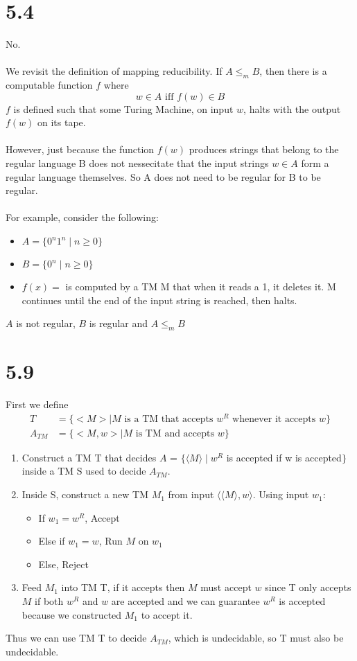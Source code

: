 \documentclass{article}
\begin{document}
\section*{5.4}

No.\\\\
We revisit the definition of mapping reducibility. If $A \leq_m B$, then there is a computable function $f$ where
$$w \in A \textrm{  iff   } f(w) \in B$$
$f$ is defined such that some Turing Machine, on input $w$, halts with the output $f(w)$ on its tape. \\\\
However, just because the function $f(w)$ produces strings that belong to the regular language B does not nessecitate that the input strings $w \in A$ form a regular language themselves. So A does not need to be regular for B to be regular.\\\\
For example, consider the following:
\begin{itemize}
\item $A = \{0^n1^n \mid n \geq 0\}$
\item $B = \{0^n \mid n \geq 0\}$
\item $f(x)= $ is computed by a TM M that when it reads a 1, it deletes it. M continues until the end of the input string is reached, then halts.
\end{itemize}
$A$ is not regular, $B$ is regular and $A \leq_m B$

\section*{5.9}

First we define
\begin{align*}
    T &= \{ <M> | M \textrm{ is a TM that accepts } w^R  \textrm{ whenever it accepts } w \}\\
    A_{TM} &= \{ <M, w> | M \textrm{ is TM and accepts } w \} 
\end{align*} 

\begin{enumerate}
    \item Construct a TM T that decides $A$ = $\{ \langle M \rangle \mid w^R$ is accepted if w is accepted$\}$ inside a TM S used to decide $A_{TM}$.
    \item Inside S, construct a new TM $M_1$ from input $\langle \langle M\rangle, w \rangle$. Using input $w_1$:
    \begin{itemize}
        \item If $w_1 = w^R$, Accept
        \item Else if $w_1 = w$, Run $M$ on $w_1$
        \item Else, Reject 
    \end{itemize}
    \item Feed ${M_1}$ into TM T, if it accepts then $M$ must accept $w$ since T only accepts ${M}$ if both $w^R$ and $w$ are accepted and we can guarantee $w^R$ is accepted because we constructed $M_1$ to accept it.
\end{enumerate}
Thus we can use TM T to decide $A_{TM}$, which is undecidable, so T must also be undecidable.
\end{document}
